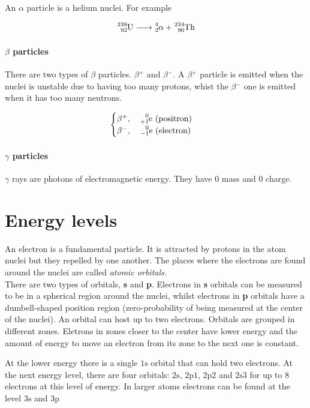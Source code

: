 \documentclass[a4paper]{article}
\begin{document}
An \(\alpha\) particle is a helium nuclei. For example

\[
    \ce{^238_92U -> ^4_2\alpha{} + ^234_90Th}
\]

\paragraph{\(\beta\) particles}

There are two types of \(\beta{}\) particles. \(\beta{}^+\) and \(\beta{}^-\).
A \(\beta{}^+\) particle is emitted when the nuclei is unstable due to
having too many protons, whist the \(\beta{}^-\) one is emitted when it has
too many neutrons.

\[
    \begin{cases}
        \beta{}^+,\quad \ce{^0_{+1}e} \text{ (positron)} \\
        \beta{}^-,\quad \ce{^0_{-1}e} \text{ (electron)}
    \end{cases}
\]

\paragraph{\(\gamma\) particles}

\(\gamma\) rays are photons of electromagnetic energy. They have \(0\) mass and \(0\) charge.

\pagebreak

\section{Energy levels}

An electron is a fundamental particle. It is attracted by protons in the
atom nuclei but they repelled by one another.
The places where the electrons are found around the nuclei are called
\textit{atomic orbitals.} \\
There are two types of orbitals, \textbf{s} and \textbf{p}.
Electrons in \textbf{s} orbitals can be measured to be in a spherical region around the nuclei,
whilst electrons in \textbf{p} orbitals have a dumbell-shaped position region
(zero-probability of being measured at the center of the nuclei).
An orbital can host up to two electrons.
Orbitals are grouped in different zones.
Eletrons in zones closer to the center have lower energy and the amount of energy
to move an electron from its zone to the next one is constant.

At the lower energy there is a single \(1\text{s}\) orbital that can hold two electrons.
At the next energy level, there are four orbitals:
\(2\text{s}\), \(2\text{p}1\), \(2\text{p}2\) and \(2\text{s}3\) for up to 8 electrons at this level of energy.
In larger atoms electrons can be found at the level \(3\text{s}\) and \(3\text{p}\)
\end{document}
